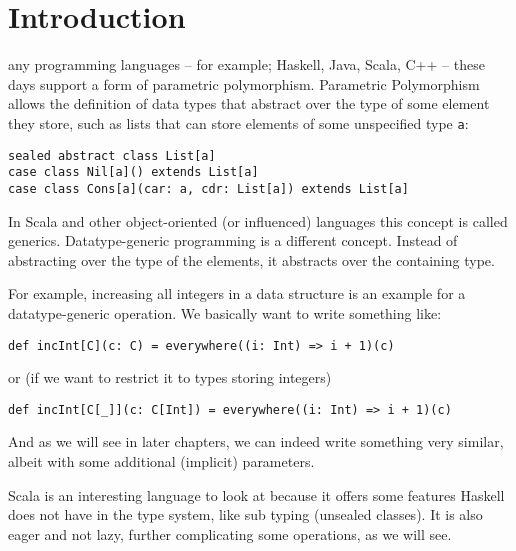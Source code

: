 \chapter{Introduction}
any programming languages -- for example; Haskell, Java, Scala, C++ --
these days support a form of parametric polymorphism.
Parametric Polymorphism allows the definition of data types that abstract over
the type of some element they store, such as lists that can store elements of
some unspecified type \lstinline{a}:
\begin{lstlisting}
sealed abstract class List[a]
case class Nil[a]() extends List[a]
case class Cons[a](car: a, cdr: List[a]) extends List[a]
\end{lstlisting}
In Scala and other object-oriented (or influenced) languages this concept is
called generics.
Datatype-generic programming is a different concept. Instead of abstracting
over the type of the elements, it abstracts over the containing type.

For example, increasing all integers in a data structure is an example for a
datatype-generic operation. We basically want to write something like:
\begin{lstlisting}
def incInt[C](c: C) = everywhere((i: Int) => i + 1)(c)
\end{lstlisting}
or (if we want to restrict it to types storing integers)
\begin{lstlisting}
def incInt[C[_]](c: C[Int]) = everywhere((i: Int) => i + 1)(c)
\end{lstlisting}
And as we will see in later chapters, we can indeed write something very similar,
albeit with some additional (implicit) parameters.

Scala is an interesting language to look at because it offers some features Haskell
does not have in the type system, like sub typing (unsealed classes). It is also
eager and not lazy, further complicating some operations, as we will see.
